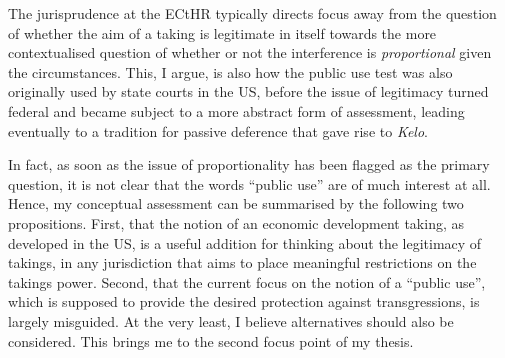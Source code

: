 The jurisprudence at the ECtHR typically directs focus away from the question of whether the aim of a taking is legitimate in itself towards the more contextualised question of whether or not the interference is {\it proportional} given the circumstances. This, I argue, is also how the public use test was also originally used by state courts in the US, before the issue of legitimacy turned federal and became subject to a more abstract form of assessment, leading eventually to a tradition for passive deference that gave rise to {\it Kelo}.

In fact, as soon as the issue of proportionality has been flagged as the primary question, it is not clear that the words ``public use'' are of much interest at all. Hence, my conceptual assessment can be summarised by the following two propositions. First, that the notion of an economic development taking, as developed in the US, is a useful addition for thinking about the legitimacy of takings, in any jurisdiction that aims to place meaningful restrictions on the takings power. Second, that the current focus on the notion of a ``public use'', which is supposed to provide the desired protection against transgressions, is largely misguided. At the very least, I believe alternatives should also be considered. This brings me to the second focus point of my thesis.


